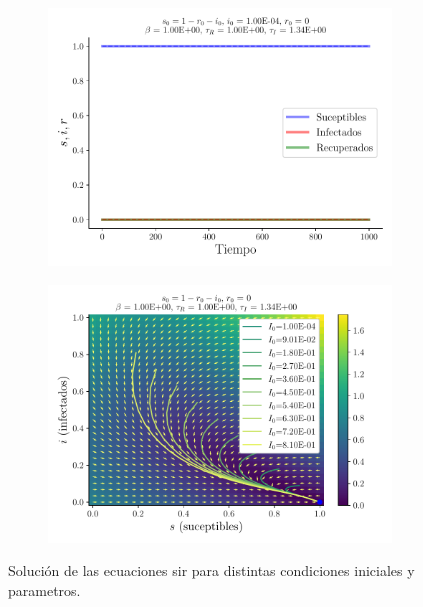 \documentclass[twocolumn,aps,prl]{revtex4-1}
\begin{document}
\begin{figure}[ht!]
  \begin{subfigure}[b]{0.49\linewidth}
      \centering
      \includegraphics[width = 1.05\textwidth]{figuras/ex01-c-sir.pdf}
      \caption{}
      \label{fig:ex01-c-sir}
  \end{subfigure}\quad
  \begin{subfigure}[b]{0.49\linewidth}
      \centering
      \includegraphics[width = 1.05\textwidth]{figuras/ex01-c-vector.pdf}
      \caption{}
      \label{fig:ex01-c-vector}
  \end{subfigure}\quad
  \caption{Solución de las ecuaciones sir para distintas condiciones iniciales y parametros.}
  \label{fig:ex01}
\end{figure}
\end{document}
